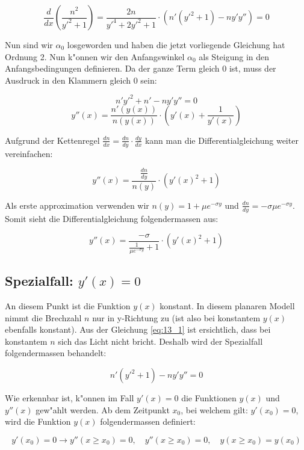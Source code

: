$$\frac{d}{dx} \left( \frac{n^2}{y'^2 + 1} \right) = \frac{2n}{y'^4 + 2y'^2 + 1} \cdot \left( n'(y'^2 + 1) - n y' y'' \right) = 0$$

Nun sind wir $\alpha_0$ losgeworden und haben die jetzt vorliegende Gleichung hat Ordnung 2. 
Nun k"onnen wir den Anfangswinkel $\alpha_0$ als Steigung in den Anfangsbedingungen definieren. 
Da der ganze Term gleich 0 ist, muss der Ausdruck in den Klammern gleich 0 sein:

$$n'y'^2 + n' - n y' y'' = 0$$
$$y''(x) = \frac{n'(y(x))}{n(y(x))} \cdot \left( y'(x) + \frac{1}{y'(x)} \right)$$

Aufgrund der Kettenregel $\frac{dn}{dx} = \frac{dn}{dy} \cdot \frac{dy}{dx}$ kann man die Differentialgleichung weiter vereinfachen:

\begin{equation} \label{eq:planar_DGL}
y''(x) = \frac{\frac{dn}{dy}}{n(y)} \cdot \left( y'(x)^2 + 1\right)
\end{equation}

Als erste approximation verwenden wir $n(y) = 1 + \mu e^{-\sigma y}$ und $\frac{dn}{dy} = -\sigma \mu e^{-\sigma y}$.
Somit sieht die Differentialgleichung folgendermassen aus:

\begin{equation} \label{eq:planar_DGL_n}
y''(x) = \frac{-\sigma}{\frac{1}{\mu e^{-\sigma y}} + 1} \cdot \left( y'(x)^2 + 1 \right)
\end{equation}

\subsection{Spezialfall: $y'(x) = 0$} \label{ch:spezialfall}

An diesem Punkt ist die Funktion $y(x)$ konstant. 
In diesem planaren Modell nimmt die Brechzahl $n$ nur in y-Richtung zu (ist also bei konstantem $y(x)$ ebenfalls konstant).
Aus der Gleichung \ref{eq:13_1} ist ersichtlich, dass bei konstantem $n$ sich das Licht nicht bricht. 
Deshalb wird der Spezialfall folgendermassen behandelt:

$$n' (y'^2 + 1) - n y' y'' = 0$$

Wie erkennbar ist, k"onnen im Fall $y'(x) = 0$ die Funktionen $y(x)$ und $y''(x)$ gew"ahlt werden. 
Ab dem Zeitpunkt $x_0$, bei welchem gilt: $y'(x_0) = 0$, wird die Funktion $y(x)$ folgendermassen definiert:

$$y'(x_0) = 0 \longrightarrow y''(x \geq x_0) = 0, \quad y''(x \geq x_0) = 0, \quad  y(x \geq x_0) = y(x_0)$$


